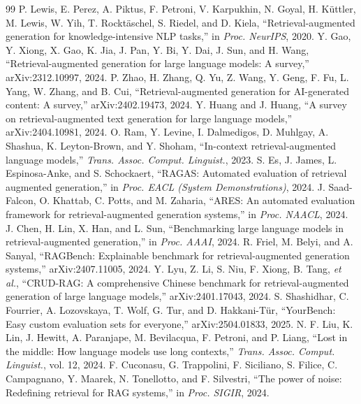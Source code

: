 \documentclass[conference]{IEEEtran}
\begin{document}
\begin{thebibliography}{99}
 P. Lewis, E. Perez, A. Piktus, F. Petroni, V. Karpukhin, N. Goyal, H. K\"uttler, M. Lewis, W. Yih, T. Rockt\"aschel, S. Riedel, and D. Kiela, ``Retrieval-augmented generation for knowledge-intensive NLP tasks,'' in \emph{Proc. NeurIPS}, 2020.
 Y. Gao, Y. Xiong, X. Gao, K. Jia, J. Pan, Y. Bi, Y. Dai, J. Sun, and H. Wang, ``Retrieval-augmented generation for large language models: A survey,'' arXiv:2312.10997, 2024.
 P. Zhao, H. Zhang, Q. Yu, Z. Wang, Y. Geng, F. Fu, L. Yang, W. Zhang, and B. Cui, ``Retrieval-augmented generation for AI-generated content: A survey,'' arXiv:2402.19473, 2024.
 Y. Huang and J. Huang, ``A survey on retrieval-augmented text generation for large language models,'' arXiv:2404.10981, 2024.
 O. Ram, Y. Levine, I. Dalmedigos, D. Muhlgay, A. Shashua, K. Leyton-Brown, and Y. Shoham, ``In-context retrieval-augmented language models,'' \emph{Trans. Assoc. Comput. Linguist.}, 2023.
 S. Es, J. James, L. Espinosa-Anke, and S. Schockaert, ``RAGAS: Automated evaluation of retrieval augmented generation,'' in \emph{Proc. EACL (System Demonstrations)}, 2024.
 J. Saad-Falcon, O. Khattab, C. Potts, and M. Zaharia, ``ARES: An automated evaluation framework for retrieval-augmented generation systems,'' in \emph{Proc. NAACL}, 2024.
 J. Chen, H. Lin, X. Han, and L. Sun, ``Benchmarking large language models in retrieval-augmented generation,'' in \emph{Proc. AAAI}, 2024.
 R. Friel, M. Belyi, and A. Sanyal, ``RAGBench: Explainable benchmark for retrieval-augmented generation systems,'' arXiv:2407.11005, 2024.
 Y. Lyu, Z. Li, S. Niu, F. Xiong, B. Tang, \emph{et al.}, ``CRUD-RAG: A comprehensive Chinese benchmark for retrieval-augmented generation of large language models,'' arXiv:2401.17043, 2024.
 S. Shashidhar, C. Fourrier, A. Lozovskaya, T. Wolf, G. Tur, and D. Hakkani-T\"ur, ``YourBench: Easy custom evaluation sets for everyone,'' arXiv:2504.01833, 2025.
 N. F. Liu, K. Lin, J. Hewitt, A. Paranjape, M. Bevilacqua, F. Petroni, and P. Liang, ``Lost in the middle: How language models use long contexts,'' \emph{Trans. Assoc. Comput. Linguist.}, vol. 12, 2024.
 F. Cuconasu, G. Trappolini, F. Siciliano, S. Filice, C. Campagnano, Y. Maarek, N. Tonellotto, and F. Silvestri, ``The power of noise: Redefining retrieval for RAG systems,'' in \emph{Proc. SIGIR}, 2024.

\end{thebibliography}
\end{document}
